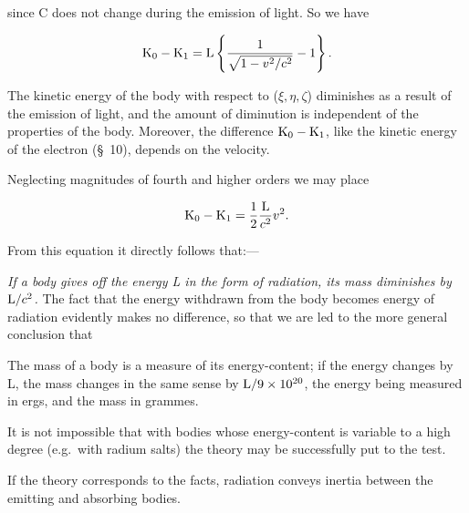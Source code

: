 \documentclass[11pt]{article}
\begin{document}
\noindent
since C does not change during the emission of light. So we have 

\[ {\rm K}_0 - {\rm K}_1 = {\rm L}\left\{ \frac{1}{\sqrt{1-v^2/c^2}}-1\right\}. \]

The kinetic energy of the body with respect to ($\xi,\eta,\zeta$)
diminishes as a result of the emission of light, and the amount
of diminution is independent of the properties of the body.
Moreover, the difference ${\rm K}_0-{\rm K}_1$, like the kinetic
energy of the electron (\S~10), depends on the velocity.

Neglecting magnitudes of fourth and higher orders we may place 

\[ {\rm K}_0 - {\rm K}_1 = \frac{1}{2}\frac{{\rm L}}{c^2}v^2. \]

\noindent
From this equation it directly follows that:---

{\em If a body gives off the energy L in the form of radiation, its mass
diminishes by ${\rm L}/c^2$.} 
The fact that the energy withdrawn from the body
becomes energy of radiation evidently makes no difference, so that we
are led to the more general conclusion that

The mass of a body is a measure of its energy-content; if the energy
changes by L, the mass changes in the same sense by
${\rm L}/9\times 10^{20}$, the energy being measured
in ergs, and the mass in grammes.

It is not impossible that with bodies whose energy-content is variable
to a high degree (e.g.\ with radium salts) the theory may be
successfully put to the test.

If the theory corresponds to the facts, radiation conveys 
inertia between the emitting and absorbing bodies.
\end{document}
